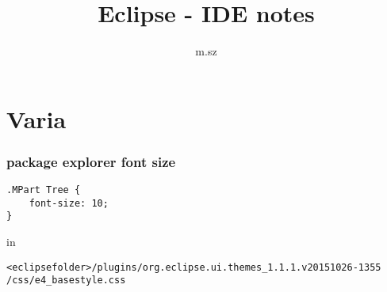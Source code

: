 \documentclass{report}
\title{Eclipse - IDE notes}
\author{m.sz}
\begin{document}
\maketitle
{}
\tableofcontents
{}


\part{Varia}


\section{package explorer font size}
\begin{verbatim}
.MPart Tree {
    font-size: 10;
}
\end{verbatim}
in
\begin{verbatim}
<eclipsefolder>/plugins/org.eclipse.ui.themes_1.1.1.v20151026-1355
/css/e4_basestyle.css
\end{verbatim}
\end{document}
